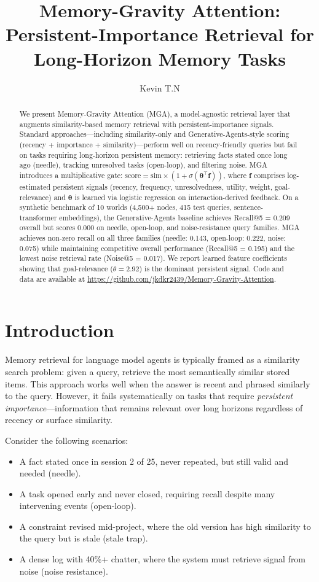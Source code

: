 \documentclass[11pt,a4paper]{article}
\title{Memory-Gravity Attention:\\Persistent-Importance Retrieval for Long-Horizon Memory Tasks}
\author{Kevin T.N}
\date{}
\begin{document}
\maketitle

\begin{abstract}
We present Memory-Gravity Attention (MGA), a model-agnostic retrieval layer that augments similarity-based memory retrieval with persistent-importance signals. Standard approaches---including similarity-only and Generative-Agents-style scoring (recency + importance + similarity)---perform well on recency-friendly queries but fail on tasks requiring long-horizon persistent memory: retrieving facts stated once long ago (needle), tracking unresolved tasks (open-loop), and filtering noise. MGA introduces a multiplicative gate: $\text{score} = \text{sim} \times (1 + \sigma(\boldsymbol{\theta}^\top \mathbf{f}))$, where $\mathbf{f}$ comprises log-estimated persistent signals (recency, frequency, unresolvedness, utility, weight, goal-relevance) and $\boldsymbol{\theta}$ is learned via logistic regression on interaction-derived feedback. On a synthetic benchmark of 10 worlds (4,500+ nodes, 415 test queries, sentence-transformer embeddings), the Generative-Agents baseline achieves Recall@5 = 0.209 overall but scores 0.000 on needle, open-loop, and noise-resistance query families. MGA achieves non-zero recall on all three families (needle: 0.143, open-loop: 0.222, noise: 0.075) while maintaining competitive overall performance (Recall@5 = 0.195) and the lowest noise retrieval rate (Noise@5 = 0.017). We report learned feature coefficients showing that goal-relevance ($\theta = 2.92$) is the dominant persistent signal. Code and data are available at \url{https://github.com/jkdkr2439/Memory-Gravity-Attention}.
\end{abstract}

\section{Introduction}

Memory retrieval for language model agents is typically framed as a similarity search problem: given a query, retrieve the most semantically similar stored items. This approach works well when the answer is recent and phrased similarly to the query. However, it fails systematically on tasks that require \emph{persistent importance}---information that remains relevant over long horizons regardless of recency or surface similarity.

Consider the following scenarios:
\begin{itemize}[leftmargin=2em]
\item A fact stated once in session 2 of 25, never repeated, but still valid and needed (needle).
\item A task opened early and never closed, requiring recall despite many intervening events (open-loop).
\item A constraint revised mid-project, where the old version has high similarity to the query but is stale (stale trap).
\item A dense log with 40\%+ chatter, where the system must retrieve signal from noise (noise resistance).
\end{itemize}
\end{document}
